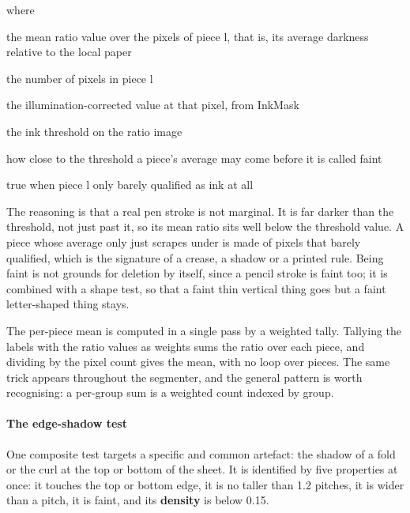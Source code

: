 \noindent where
\begin{description}[leftmargin=2.4em,style=nextline,font=\normalfont\ttfamily]\setlength\itemsep{1pt}
  \item[{$\overline{\mathrm{ratio}}_{\ell}$}] \normalfont the mean ratio value over the pixels of piece l, that is, its average darkness relative to the local paper
  \item[{$A_{\ell}$}] \normalfont the number of pixels in piece l
  \item[{$\mathrm{ratio}[y,x]$}] \normalfont the illumination-corrected value at that pixel, from InkMask
  \item[{$t_{\mathrm{Otsu}}$}] \normalfont the ink threshold on the ratio image
  \item[{$0.85$}] \normalfont how close to the threshold a piece's average may come before it is called faint
  \item[{$\mathrm{faint}_{\ell}$}] \normalfont true when piece l only barely qualified as ink at all
\end{description}
The reasoning is that a real pen stroke is not marginal. It is far darker than the threshold, not just past it, so its mean ratio sits well below the threshold value. A piece whose average only just scrapes under is made of pixels that barely qualified, which is the signature of a crease, a shadow or a printed rule. Being faint is not grounds for deletion by itself, since a pencil stroke is faint too; it is combined with a shape test, so that a faint thin vertical thing goes but a faint letter-shaped thing stays.

The per-piece mean is computed in a single pass by a weighted tally. Tallying the labels with the ratio values as weights sums the ratio over each piece, and dividing by the pixel count gives the mean, with no loop over pieces. The same trick appears throughout the segmenter, and the general pattern is worth recognising: a per-group sum is a weighted count indexed by group.


\paragraph{The edge-shadow test}
One composite test targets a specific and common artefact: the shadow of a fold or the curl at the top or bottom of the sheet. It is identified by five properties at once: it touches the top or bottom edge, it is no taller than 1.2 pitches, it is wider than a pitch, it is faint, and its \textbf{density} is below 0.15.


